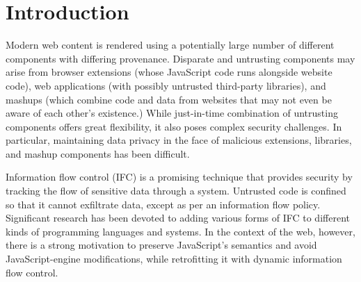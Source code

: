 \section{Introduction}
\label{sec:intro}

Modern web content is rendered using a potentially large number of
different components with differing provenance.
Disparate and untrusting components may arise from browser
extensions (whose JavaScript code runs alongside website
code), web applications (with possibly untrusted third-party
libraries), and mashups (which combine code and data from
websites that may not even be aware of each other's existence.)
While just-in-time combination of untrusting components
offers great flexibility, it also poses complex security challenges.
In particular, maintaining data privacy in the face of malicious
extensions, libraries, and mashup components has been difficult.

Information flow control (IFC) is a promising technique
that provides security
by tracking the flow of sensitive data through a system.
Untrusted code is confined so that it cannot exfiltrate data, except as
per an information flow policy.  Significant research has been devoted to
adding various forms of IFC to different kinds of programming languages
and systems.  In the context of the web, however, there is a strong
motivation to preserve JavaScript's semantics and avoid
JavaScript-engine modifications, while retrofitting it with dynamic information
flow control.


